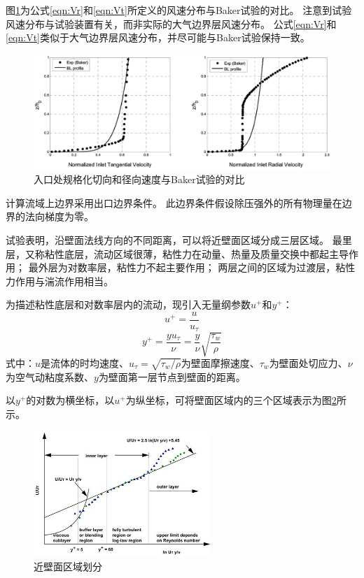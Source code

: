图\ref{fig:bc-inlet}为公式\eqref{eqn:Vr}和\eqref{eqn:Vt}所定义的风速分布与Baker\cite{baker1981boundary}试验的对比。
注意到试验风速分布与试验装置有关，而非实际的大气边界层风速分布。
公式\eqref{eqn:Vr}和\eqref{eqn:Vt}类似于大气边界层风速分布，并尽可能与Baker\cite{baker1981boundary}试验保持一致。
\begin{figure}[!htbp]
  \centering
  \includegraphics[width=\textwidth]{tornado-simulation/fig/bc_inlet.png}
  \caption{入口处规格化切向和径向速度与Baker\cite{baker1981boundary}试验的对比}
  \label{fig:bc-inlet}
\end{figure}

计算流域上边界采用出口边界条件。
此边界条件假设除压强外的所有物理量在边界的法向梯度为零\cite{fluent2015user}。

试验表明，沿壁面法线方向的不同距离，可以将近壁面区域分成三层区域。
最里层，又称粘性底层，流动区域很薄，粘性力在动量、热量及质量交换中都起主导作用；
最外层为对数率层，粘性力不起主要作用；
两层之间的区域为过渡层，粘性力作用与湍流作用相当。

为描述粘性底层和对数率层内的流动，现引入无量纲参数$u^{+}$和$y^{+}$：
\begin{equation}
  u^{+} = \frac{u}{u_{\tau}}
\end{equation}
\begin{equation}
  y^{+} = \frac{y u_{\tau}}{\nu} = \frac{y}{\nu} \sqrt{\frac{\tau_w}{\rho}}
\end{equation}
式中：$u$是流体的时均速度、$u_{\tau}=\sqrt{\tau_w/\rho}$为壁面摩擦速度、$\tau_w$为壁面处切应力、$\nu$为空气动粘度系数、$y$为壁面第一层节点到壁面的距离。

以$y^{+}$的对数为横坐标，以$u^{+}$为纵坐标，可将壁面区域内的三个区域表示为图\ref{fig:uplus}所示\cite{fluent2015theory}。
\begin{figure}[!htbp]
  \centering
  \includegraphics[width=0.6\textwidth]{tornado-simulation/fig/uplus.jpg}
  \caption{近壁面区域划分}\label{fig:uplus}
\end{figure}

